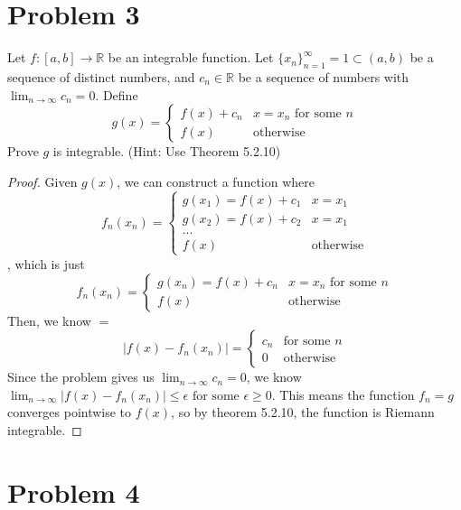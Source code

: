 \documentclass{article}
\begin{document}
\section*{Problem 3}
Let $f : [a, b] \rightarrow \mathbb{R}$ be an integrable function. Let $\{ x_n \}^{\infty}_{n=1}=1 \subset (a, b)$ be a sequence of distinct numbers, and $c_n \in \mathbb{R}$ be a sequence of numbers with $ \lim_{n \rightarrow \infty} c_n = 0 $. Define
$$
g(x) = 
\begin{cases}
    f(x) + c_n & x = x_n \text{ for some } n\\
    f(x) & \text{otherwise}
\end{cases}
$$
Prove $g$ is integrable. (Hint: Use Theorem 5.2.10)
\begin{proof}
Given $g(x)$, we can construct a function where 
$$
f_n(x_n) = 
\begin{cases}
    g(x_1) = f(x) + c_1 & x = x_1 \\
    g(x_2) = f(x) + c_2 & x = x_1 \\
    ...\\
    f(x) & \text{otherwise}
\end{cases}
$$, which is just
$$
f_n(x_n) = 
\begin{cases}
    g(x_n) = f(x) + c_n & x = x_n \text{ for some } n \\
    f(x) & \text{otherwise}
\end{cases}
$$
Then, we know $ = $
$$
|f(x)-f_n(x_n) | = 
\begin{cases}
    c_n & \text{for some } n \\
    0 & \text{otherwise}
\end{cases}
$$
Since the problem gives us $ \lim_{n \rightarrow \infty} c_n = 0 $, we know $\lim_{n \rightarrow \infty}|f(x)-f_n(x_n) | \leq \epsilon \text{ for some } \epsilon \geq 0$. This means the function $f_n = g$ converges pointwise to $f(x)$, so by theorem 5.2.10, the function is Riemann integrable.
\end{proof}
\clearpage
\section*{Problem 4}
\end{document}
